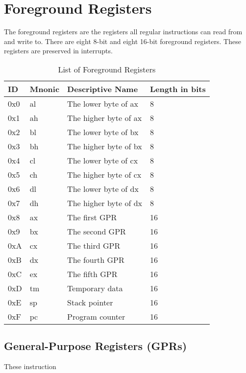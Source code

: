 \documentclass[oneside, a4paper]{memoir}
\begin{document}
\section{Foreground Registers}
The foreground registers are the registers all regular instructions can read from and write to. There are eight 8-bit and eight 16-bit foreground registers. These registers are preserved in interrupts.
\begin{table}[]
\centering
\caption{List of Foreground Registers}
\label{List of Foreground Registers}
\begin{tabular}{|l|l|l|l|}
\hline
ID  & Mnonic & Descriptive Name      & Length in bits \\ \hline
0x0 & al     & The lower byte of ax  & 8              \\ \hline
0x1 & ah     & The higher byte of ax & 8              \\ \hline
0x2 & bl     & The lower byte of bx  & 8              \\ \hline
0x3 & bh     & The higher byte of bx & 8              \\ \hline
0x4 & cl     & The lower byte of cx  & 8              \\ \hline
0x5 & ch     & The higher byte of cx & 8              \\ \hline
0x6 & dl     & The lower byte of dx  & 8              \\ \hline
0x7 & dh     & The higher byte of dx & 8              \\ \hline
0x8 & ax     & The first GPR         & 16             \\ \hline
0x9 & bx     & The second GPR        & 16             \\ \hline
0xA & cx     & The third GPR         & 16             \\ \hline
0xB & dx     & The fourth GPR        & 16             \\ \hline
0xC & ex     & The fifth GPR         & 16             \\ \hline
0xD & tm     & Temporary data        & 16             \\ \hline
0xE & sp     & Stack pointer         & 16             \\ \hline
0xF & pc     & Program counter       & 16             \\ \hline
\end{tabular}
\end{table}
\subsection{General-Purpose Registers (GPRs)}
These instruction
\end{document}
